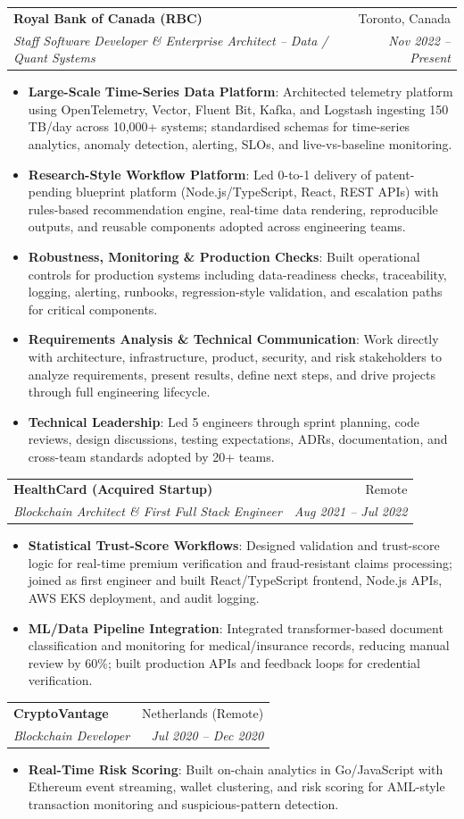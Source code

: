 \documentclass[letterpaper,9.5pt]{article}
\makeatletter
\newcommand{\resumeItem}[2]{\item\small{\textbf{#1}{: #2 \vspace{-2pt}}}}
\newcommand{\resumeSubheading}[4]{\vspace{-2pt}\item\begin{tabular*}{0.97\textwidth}{l@{\extracolsep{\fill}}r}\textbf{#1} & #2 \\\textit{\small#3} & \textit{\small #4} \\\end{tabular*}\vspace{-6pt}}
\newcommand{\resumeItemListStart}{\begin{itemize}}
\newcommand{\resumeItemListEnd}{\end{itemize}\vspace{-6pt}}
\makeatother
\begin{document}
  \resumeSubheading
    {Royal Bank of Canada (RBC)}{Toronto, Canada}
    {Staff Software Developer \& Enterprise Architect -- Data / Quant Systems}{Nov 2022 -- Present}
  \resumeItemListStart
    \resumeItem{Large-Scale Time-Series Data Platform}
      {Architected telemetry platform using OpenTelemetry, Vector, Fluent Bit, Kafka, and Logstash ingesting 150\,TB/day across 10,000+ systems; standardised schemas for time-series analytics, anomaly detection, alerting, SLOs, and live-vs-baseline monitoring.}
    \resumeItem{Research-Style Workflow Platform}
      {Led 0-to-1 delivery of patent-pending blueprint platform (Node.js/TypeScript, React, REST APIs) with rules-based recommendation engine, real-time data rendering, reproducible outputs, and reusable components adopted across engineering teams.}
    \resumeItem{Robustness, Monitoring \& Production Checks}
      {Built operational controls for production systems including data-readiness checks, traceability, logging, alerting, runbooks, regression-style validation, and escalation paths for critical components.}
    \resumeItem{Requirements Analysis \& Technical Communication}
      {Work directly with architecture, infrastructure, product, security, and risk stakeholders to analyze requirements, present results, define next steps, and drive projects through full engineering lifecycle.}
    \resumeItem{Technical Leadership}
      {Led 5 engineers through sprint planning, code reviews, design discussions, testing expectations, ADRs, documentation, and cross-team standards adopted by 20+ teams.}
  \resumeItemListEnd

  \resumeSubheading
    {HealthCard (Acquired Startup)}{Remote}
    {Blockchain Architect \& First Full Stack Engineer}{Aug 2021 -- Jul 2022}
  \resumeItemListStart
    \resumeItem{Statistical Trust-Score Workflows}
      {Designed validation and trust-score logic for real-time premium verification and fraud-resistant claims processing; joined as first engineer and built React/TypeScript frontend, Node.js APIs, AWS EKS deployment, and audit logging.}
    \resumeItem{ML/Data Pipeline Integration}
      {Integrated transformer-based document classification and monitoring for medical/insurance records, reducing manual review by 60\%; built production APIs and feedback loops for credential verification.}
  \resumeItemListEnd

  \resumeSubheading
    {CryptoVantage}{Netherlands (Remote)}
    {Blockchain Developer}{Jul 2020 -- Dec 2020}
  \resumeItemListStart
    \resumeItem{Real-Time Risk Scoring}
      {Built on-chain analytics in Go/JavaScript with Ethereum event streaming, wallet clustering, and risk scoring for AML-style transaction monitoring and suspicious-pattern detection.}
  \resumeItemListEnd
\end{document}
